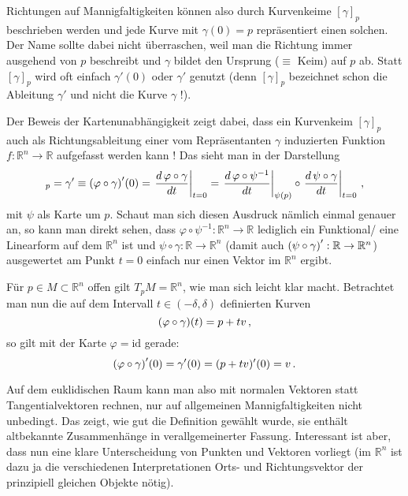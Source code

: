 \documentclass[../H_Analysis_main.tex]{subfiles}
\begin{document}

Richtungen auf Mannigfaltigkeiten können also durch Kurvenkeime $[\gamma]_p$ beschrieben werden und jede Kurve mit $\gamma(0) = p$ repräsentiert einen solchen. Der Name sollte dabei nicht überraschen, weil man die Richtung immer ausgehend von $p$ beschreibt und $\gamma$ bildet den Ursprung ($\equiv$ Keim) auf $p$ ab. Statt $[\gamma]_p$ wird oft einfach $\gamma'(0)$ oder $\gamma'$ genutzt (denn $[\gamma]_p$ bezeichnet schon die Ableitung $\gamma'$ und nicht die Kurve $\gamma$ !).

Der Beweis der Kartenunabhängigkeit zeigt dabei, dass ein Kurvenkeim $[\gamma]_p$ auch als Richtungsableitung einer vom Repräsentanten $\gamma$ induzierten Funktion $f: \mathbb{R}^n \rightarrow \mathbb{R}$ aufgefasst werden kann ! Das sieht man in der Darstellung
\begin{equation}
[\gamma]_p = \gamma' \equiv \qty(\varphi \circ \gamma)'(0) = \eval{\dv{\, \varphi \circ \gamma}{t}}_{t = 0} = \eval{\dv{\, \varphi \circ \psi^{-1}}{t}}_{\psi(p)} \circ \eval{\dv{\, \psi \circ \gamma}{t}}_{t = 0} \, ,
\end{equation}
mit $\psi$ als Karte um $p$. Schaut man sich diesen Ausdruck nämlich einmal genauer an, so kann man direkt sehen, dass $\varphi \circ \psi^{-1}: \mathbb{R}^n \rightarrow \mathbb{R}$ lediglich ein Funktional/ eine Linearform auf dem $\mathbb{R}^n$ ist und $\psi \circ \gamma: \mathbb{R} \rightarrow \mathbb{R}^n$ (damit auch $\qty(\psi \circ \gamma)': \mathbb{R} \rightarrow \mathbb{R}^n$) ausgewertet am Punkt $t = 0$ einfach nur einen Vektor im $\mathbb{R}^n$ ergibt.%


\begin{bsp}
Für $p \in M \subset \mathbb{R}^n$ offen gilt $T_p M = \mathbb{R}^n$, wie man sich leicht klar macht. Betrachtet man nun die auf dem Intervall $t \in (-\delta, \delta)$ definierten Kurven
\begin{equation}
\qty(\varphi \circ \gamma)(t) = p + t v \, ,
\end{equation}
so gilt mit der Karte $\varphi = \text{id}$ gerade:
\begin{equation}
\qty(\varphi \circ \gamma)'(0) = \gamma'(0) = (p + t v)'(0) = v \, .
\end{equation}
\end{bsp}
Auf dem euklidischen Raum kann man also mit normalen Vektoren statt Tangentialvektoren rechnen, nur auf allgemeinen Mannigfaltigkeiten nicht unbedingt. Das zeigt, wie gut die Definition gewählt wurde, sie enthält altbekannte Zusammenhänge in verallgemeinerter Fassung. Interessant ist aber, dass nun eine klare Unterscheidung von Punkten und Vektoren vorliegt (im $\mathbb{R}^n$ ist dazu ja die verschiedenen Interpretationen Orts- und Richtungsvektor der prinzipiell gleichen Objekte nötig).
\end{document}
